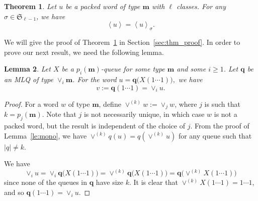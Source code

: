 \documentclass[reqno]{amsart}
\newcommand{\0}{\phantom{c}}
\newcommand{\swt}[1]{\left\langle #1 \right\rangle} %
\newcommand{\merge}[1]{\vee_{#1}} %
\newcommand{\SymGp}[1]{\mathfrak{S}_{#1}} %
\newcommand{\mm}{\mathbf{m}}
\newcommand{\qq}{\mathbf{q}}
\theoremstyle{plain}
\newtheorem{thm}{Theorem}[section]
\newtheorem{lemma}[thm]{Lemma}
\theoremstyle{definition}
\numberwithin{equation}{section}
\begin{document}
\begin{thm}
\label{thm:permutation}
  Let $u$ be a packed word of type $\mm$ with $\ell$ classes.
  For any $\sigma \in \SymGp{\ell-1}$, we have 
  \[
  \swt{u} = \swt{u}_{\sigma}.
  \]
\end{thm}

We will give the proof of Theorem~\ref{thm:permutation} in Section~\ref{sec:thm_proof}.
In order to prove our next result, we need the following lemma.

\begin{lemma}
\label{lemma:queue_merge}
  Let $X$ be a $p_i(\mm)$-queue for some type $\mm$ and some $i \geq 1$.
  Let $\qq$ be an MLQ of type $\merge{i}\mm$.
  For the word
  $
  u = \qq\bigl( X(1 \dotsm 1) \bigr),
  $
  we have
  \[
  v := \qq(1 \dotsm 1) = \merge{i} u.
  \]
\end{lemma}

\begin{proof}
For a word $w$ of type $\mm$, define $\vee^{(k)} w := \merge{j} w$, where $j$ is such that $k = p_j(\mm)$.
Note that $j$ is not necessarily unique, in which case $w$ is not a packed word, but the result is independent of the choice of $j$.
From the proof of Lemma~\ref{le:mono}, we have $\vee^{(k)} q(u)= q(\vee^{(k)} u)$ for any queue such that $\lvert q \rvert \neq k$.

We have
\[
\merge{i} u = \merge{i} \qq\bigl( X (1 \dotsm 1) \bigr) = \vee^{(k)} \qq\bigl( X (1 \dotsm 1) \bigr) = \qq\bigl( \vee^{(k)} X (1 \dotsm 1) \bigr)
\]
since none of the queues in $\qq$ have size $k$.
It is clear that $\vee^{(k)} X(1 \dotsm 1) = 1 \dotsm 1$, and so $\qq(1 \dotsm 1) = \merge{i} u$.
\end{proof}
\end{document}
